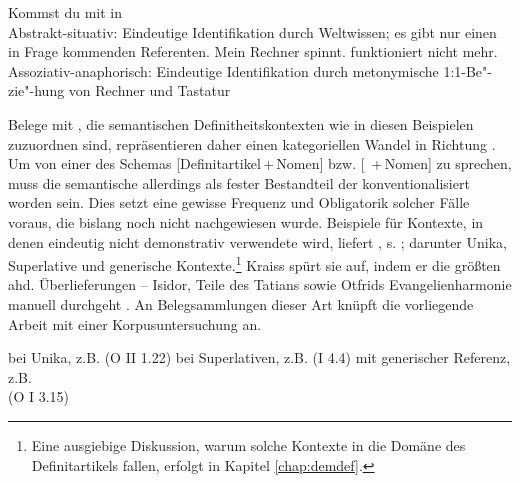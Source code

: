 \begin{exe}
	\ex 
	\begin{xlist} \label{ex:sem-def}\raggedright
		\ex \label{ex:sem-def1} Kommst du mit in  \\ Abstrakt-situativ: Eindeutige Identifikation durch Weltwissen; es gibt nur einen in Frage kommenden Referenten. 
		\ex \label{ex:sem-def2}  Mein Rechner spinnt.  funktioniert nicht mehr. \\ Assoziativ-anaphorisch: Eindeutige Identifikation durch metonymische  1:1-Be"-zie"-hung von Rechner und Tastatur
		\end{xlist}
\end{exe}
\noindent
Belege mit , die semantischen  Definitheitskontexten  wie in diesen Beispielen zuzuordnen sind, repräsentieren daher einen kategoriellen Wandel in Richtung . Um von einer  des Schemas  [Definitartikel\,+\,Nomen]  bzw. [ \,+\,Nomen] zu sprechen, muss die semantische 
 allerdings als fester Bestandteil der   konventionalisiert worden sein. Dies setzt eine gewisse Frequenz und Obligatorik solcher Fälle voraus, die bislang noch nicht nachgewiesen wurde. Beispiele für Kontexte, in denen  eindeutig nicht demonstrativ verwendete wird, liefert \textcite[135--137]{Kraiss2014}, s. ; darunter  Unika, Superlative  und generische  Kontexte.\footnote{Eine ausgiebige Diskussion, warum solche Kontexte in die Domäne des Definitartikels  fallen, erfolgt in Kapitel \ref{chap:demdef}.}  Kraiss spürt sie auf, indem er  die größten ahd. Überlieferungen -- Isidor, Teile des Tatians sowie Otfrids Evangelienharmonie manuell durchgeht \parencite{Kraiss2012}. An Belegsammlungen dieser Art \parencite[vgl. z.B. auch][]{Luhr2008,Schlachter2015} knüpft die vorliegende Arbeit mit einer Korpusuntersuchung  an. 

\begin{exe}
	\ex 
	\begin{xlist} \label{ex:kraiss}
		\ex \label{ex:kraiss-unika}  bei  Unika, z.B.   (O II 1.22) 
		\ex \label{ex:kraiss-superlativ}  bei  Superlativen, z.B.   (I 4.4)
				\ex \label{ex:kraiss-generisch}  mit  generischer Referenz, z.B.  \\  (O I 3.15)
		\end{xlist}
\end{exe}

